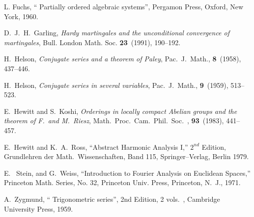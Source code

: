 \begin{thebibliography}{Dillo 83}



  L. Fuchs,
`` Partially ordered algebraic systems'', 
Pergamon Press, Oxford, New York, 1960.

 D.\ J.\ H.\ Garling,
{\em Hardy martingales and the 
unconditional convergence of martingales},
Bull. London Math. Soc. {\bf 23}\ (1991), 190--192.

  H.\ Helson,
{\em Conjugate series and a theorem of Paley}, 
Pac.\ J.\ Math., {\bf 8}\ (1958), 437--446.


  H.\ Helson,
{\em Conjugate series in several variables}, 
Pac.\ J.\ Math., {\bf 9}\ (1959), 513--523.


 E.\ Hewitt and S.\ Koshi, 
{\em Orderings in locally compact Abelian 
groups and the theorem of F.\ and M.\ Riesz}, 
Math.\ Proc.\ Cam.\ Phil.\ Soc.\ , {\bf 93}\ (1983), 441--457.

 E.\ Hewitt and K.\ A.\ Ross,
``Abstract Harmonic Analysis I,''  
$2^{nd}$ Edition, Grundlehren der
Math.\ Wissenschaften, Band 115, Springer--Verlag, Berlin 1979.





 E. \ Stein, and G.\ Weiss, 
``Introduction to Fourier Analysis 
on Euclidean Spaces,'' Princeton Math. Series, 
No. 32, Princeton Univ. Press, Princeton, N.\ J., 1971.


  A.\ Zygmund,
`` Trigonometric series'', 2nd Edition, 2 vols.\ , 
Cambridge University Press, 1959.
\end{thebibliography}













